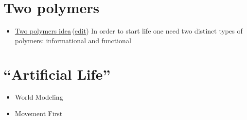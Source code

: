 \documentclass[12pt]{paper}
\newcommand{\wikilink}[2] { \href{#1.pdf}{#2}\,(\href{#1.tex}{edit})}
\begin{document}
\section{Two polymers}
\begin{itemize}
\item \wikilink{2PMod2}{Two polymers idea} In order to start life one need two distinct types 
of polymers: informational and functional
\end{itemize}

\section{``Artificial Life''}
\begin{itemize}
 \item World Modeling
\item Movement First
\end{itemize}






  
  
\end{document}
